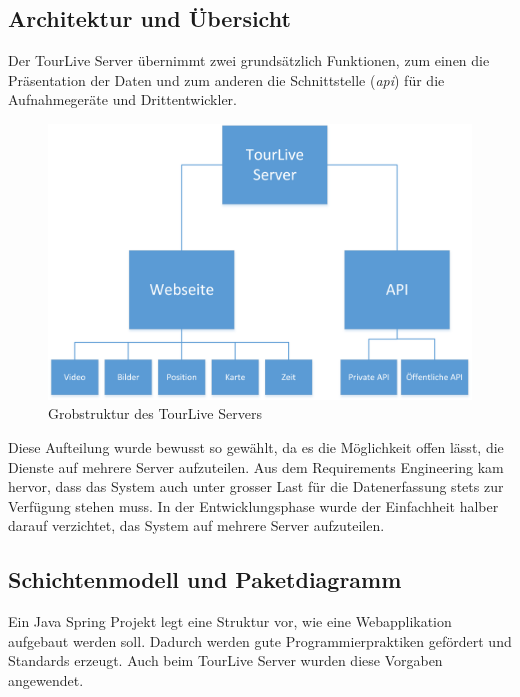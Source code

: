 \subsection{Architektur und Übersicht}
Der TourLive Server übernimmt zwei grundsätzlich Funktionen, zum einen die Präsentation der Daten und zum anderen die Schnittstelle (\textit{\gls{api}}) für die Aufnahmegeräte und Drittentwickler.
\begin{figure}[H]
	\centering
	\includegraphics[width=130mm]{images/tourliveweb/uebersicht_tourlive.png}
	\caption{Grobstruktur des TourLive Servers}
	\label{fig:grobstrukturtourliveserver}
\end{figure}
Diese Aufteilung wurde bewusst so gewählt, da es die Möglichkeit offen lässt, die Dienste auf mehrere Server aufzuteilen. Aus dem Requirements Engineering kam hervor, dass das System auch unter grosser Last für die Datenerfassung stets zur Verfügung stehen muss. In der Entwicklungsphase wurde der Einfachheit halber darauf verzichtet, das System auf mehrere Server aufzuteilen.

\subsection{Schichtenmodell und Paketdiagramm}
Ein Java Spring Projekt legt eine Struktur vor, wie eine Webapplikation aufgebaut werden soll. Dadurch werden gute Programmierpraktiken gefördert und Standards erzeugt. Auch beim TourLive Server wurden diese Vorgaben angewendet.

